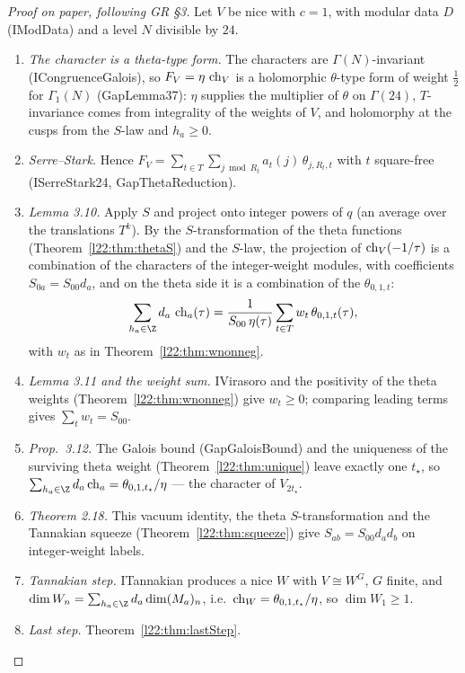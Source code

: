 \begin{proof}[Proof on paper, following GR §3]
Let $V$ be nice with $c=1$, with modular data $D$ (IModData) and a level $N$ divisible by $24$.
\begin{enumerate}
\item \emph{The character is a theta-type form.} The characters are $\Gamma(N)$-invariant (ICongruenceGalois), so
  $F_V=\eta\,\operatorname{ch}_V$ is a holomorphic $\theta$-type form of weight $\frac12$ for $\Gamma_1(N)$ (GapLemma37):
  $\eta$ supplies the multiplier of $\theta$ on $\Gamma(24)$, $T$-invariance comes from integrality of the weights
  of $V$, and holomorphy at the cusps from the $S$-law and $h_a\ge0$.
\item \emph{Serre--Stark.} Hence $F_V=\sum_{t\in T}\sum_{j\bmod R_t}a_t(j)\,\theta_{j,R_t,t}$ with $t$ square-free
  (ISerreStark24, GapThetaReduction).
\item \emph{Lemma 3.10.} Apply $S$ and project onto integer powers of $q$ (an average over the
  translations $T^k$). By the $S$-transformation of the theta functions (Theorem~\ref{l22:thm:thetaS}) and the $S$-law, the projection of $\operatorname{ch}_V(-1/\tau)$ is a combination of the
  characters of the integer-weight modules, with coefficients $S_{0a}=S_{00}d_a$, and on the theta side it is a
  combination of the $\theta_{0,1,t}$:
  \begin{equation*}
  \sum_{h_a\in\Z}d_a\,\ltwotwoch_a(\tau)=\frac{1}{S_{00}\,\eta(\tau)}\sum_{t\in T}w_t\,\theta_{0,1,t}(\tau),
  \end{equation*}
  with $w_t$ as in Theorem~\ref{l22:thm:wnonneg}.
\item \emph{Lemma 3.11 and the weight sum.} IVirasoro and the positivity of the theta weights (Theorem~\ref{l22:thm:wnonneg}) give $w_t\ge0$; comparing leading terms gives
  $\sum_tw_t=S_{00}$.
\item \emph{Prop.~3.12.} The Galois bound (GapGaloisBound) and the uniqueness of the surviving theta weight (Theorem~\ref{l22:thm:unique}) leave exactly one $t_\star$, so
  $\sum_{h_a\in\Z}d_a\ltwotwoch_a=\theta_{0,1,t_\star}/\eta$ --- the character of $V_{2t_\star}$.
\item \emph{Theorem 2.18.} This vacuum identity, the theta $S$-transformation and the Tannakian squeeze (Theorem~\ref{l22:thm:squeeze}) give $S_{ab}=S_{00}d_ad_b$ on integer-weight labels.
\item \emph{Tannakian step.} ITannakian produces a nice $W$ with $V\cong W^G$, $G$ finite, and
  $\dim W_n=\sum_{h_a\in\Z}d_a\dim(M_a)_n$, i.e.\ $\operatorname{ch}_W=\theta_{0,1,t_\star}/\eta$, so
  $\dim W_1\ge1$.
\item \emph{Last step.} Theorem~\ref{l22:thm:lastStep}.
\end{enumerate}
\end{proof}

